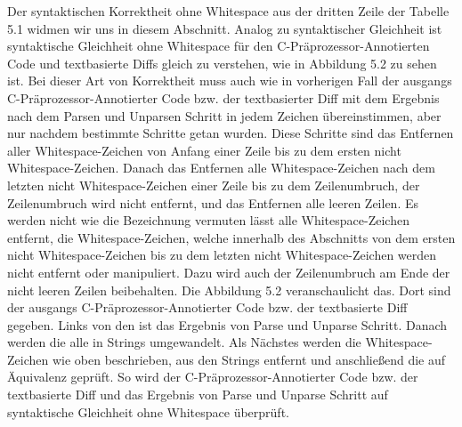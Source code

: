 Der syntaktischen Korrektheit ohne Whitespace aus der dritten Zeile der Tabelle 5.1 widmen wir uns in diesem Abschnitt. Analog zu syntaktischer Gleichheit ist syntaktische Gleichheit ohne Whitespace für den C-Präprozessor-Annotierten Code und textbasierte Diffs gleich zu verstehen, wie in Abbildung 5.2 zu sehen ist. Bei dieser Art von Korrektheit muss auch wie in vorherigen Fall der ausgangs C-Präprozessor-Annotierter Code bzw. der textbasierter Diff mit dem Ergebnis nach dem Parsen und Unparsen Schritt in jedem Zeichen übereinstimmen, aber nur nachdem bestimmte Schritte getan wurden. Diese Schritte sind das Entfernen aller Whitespace-Zeichen von Anfang einer Zeile bis zu dem ersten nicht Whitespace-Zeichen. Danach das Entfernen alle Whitespace-Zeichen nach dem letzten nicht Whitespace-Zeichen einer Zeile bis zu dem Zeilenumbruch, der Zeilenumbruch wird nicht entfernt, und das Entfernen alle leeren Zeilen. Es werden nicht wie die Bezeichnung vermuten lässt alle Whitespace-Zeichen entfernt, die Whitespace-Zeichen, welche innerhalb des Abschnitts von dem ersten nicht Whitespace-Zeichen bis zu dem letzten nicht Whitespace-Zeichen werden nicht entfernt oder manipuliert. Dazu wird auch der Zeilenumbruch am Ende der nicht leeren Zeilen beibehalten. Die Abbildung 5.2 veranschaulicht das. Dort sind der ausgangs C-Präprozessor-Annotierter Code bzw. der textbasierte Diff gegeben. Links von den ist das Ergebnis von Parse und Unparse Schritt. Danach werden die alle in Strings umgewandelt. Als Nächstes werden die Whitespace-Zeichen wie oben beschrieben, aus den Strings entfernt und anschließend die auf Äquivalenz geprüft. So wird der C-Präprozessor-Annotierter Code bzw. der textbasierte Diff und das Ergebnis von Parse und Unparse Schritt auf syntaktische Gleichheit ohne Whitespace überprüft.


